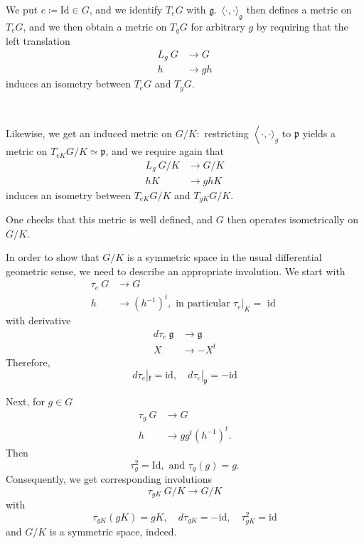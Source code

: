 	We put $e\coloneq \mathrm{Id} \in G$, and we identify $T_{e} G$ with
	$\mathfrak{g} .\ \ \langle\cdot, \cdot\rangle_{\mathfrak{g}}$
	then defines a metric on $T_{e} G$, and we then obtain a
	metric on $T_{g} G$ for arbitrary $g$ by requiring that the
	left translation
	\[
	\begin{aligned}
		L_{g}\: G & \rightarrow G \\
		h & \rightarrow g h
	\end{aligned}
	\]
	induces an isometry between $T_{e} G$ and $T_{g} G$. 
	
	\
	
	Likewise, we get an induced metric on $G / K:$ restricting
	$\left\langle\cdot,  \cdot\rangle_{g}\right.$ to $\mathfrak
	p$ yields a metric on $T_{e K} G / K \simeq \mathfrak{p}$,
	and we require again
	that
	\[
	\begin{aligned}
		L_{g}\: G / K & \rightarrow G / K \\
		h K & \rightarrow g h K
	\end{aligned}
	\]
	induces an isometry between $T_{e K} G / K$ and $T_{g K} G /
	K$.

	One checks that this metric is well defined, and $G$ then
	operates isometrically on $G / K$.
	
	In order to show that $G / K$ is a symmetric space in the
	usual differential geometric sense, we need to describe an
	appropriate involution. We start with
	\[
	\begin{aligned}
		\tau_{e}\: G & \rightarrow G \\
		h & \rightarrow\left(h^{-1}\right)^{t}, \text { in
		particular } \tau_{e }|_K=\text { id }
	\end{aligned}
	\]
	with derivative
	\[
	\begin{aligned}
		d\tau_{e}\: \mathfrak g & \rightarrow \mathfrak g \\
		X & \rightarrow-X^{t}
	\end{aligned}
	\]
	Therefore,
	\[
	d \tau_{e}|_{\mathfrak k}=\mathrm{id}, \quad d \tau_{e
	}|_{\mathfrak{p}}=-\mathrm{id}
	\]
	

	Next, for $g \in G$
	\[
	\begin{aligned}
		\tau_{g}\: G & \rightarrow G \\ h & \rightarrow g
		g^{t}\left(h^{-1}\right)^{t} .
	\end{aligned}
	\]
	Then
	\[
	\tau_{g}^{2}=\mathrm{Id}, \text { and } \tau_{g}(g)=g .
	\]
	Consequently, we get corresponding involutions
	\[
	\tau_{g K}\: G / K \rightarrow G / K
	\]
	with
	\[
	\tau_{g K}(g K)=g K, \quad d \tau_{g K}=-\mathrm{id}, \quad
	\tau_{g K}^{2}=\mathrm{id}
	\]
	and $G / K$ is a symmetric space, indeed.

